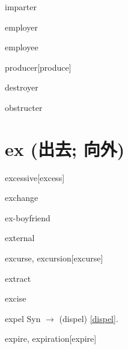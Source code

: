 \begin{RefWord}{imparter}
\end{RefWord}

\begin{RefWord}{employer}
\end{RefWord}

\begin{RefWord}{employee}
\end{RefWord}

\begin{RefWord}{producer}[produce]
\end{RefWord}

\begin{RefWord}{destroyer}
\end{RefWord}

\begin{RefWord}{obstructer}
\end{RefWord}

\section{ex (出去; 向外)}

\begin{RefWord}{excessive}[excess]
\end{RefWord}

\begin{RefWord}{exchange}
\end{RefWord}

\begin{RefWord}{ex-boyfriend}
\end{RefWord}

\begin{RefWord}{external}
\end{RefWord}

\begin{RefWord}{excurse, excursion}[excurse]
\end{RefWord}

\begin{RefWord}{extract}
\end{RefWord}

\begin{RefWord}{excise}
\end{RefWord}

\begin{RefWord}{expel}
    Syn $\rightarrow$ (dispel) \ref{dispel}.
\end{RefWord}

\begin{RefWord}{expire, expiration}[expire]
\end{RefWord}

